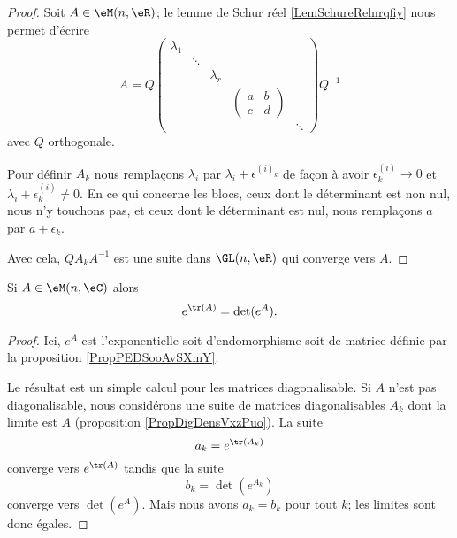 \begin{proof}
    Soit \( A\in \eM(n,\eR)\); le lemme de Schur réel \ref{LemSchureRelnrqfiy} nous permet d'écrire
    \begin{equation}
        A=Q
        \begin{pmatrix}
            \lambda_1    &       &       &       &   \\  
                &   \ddots    &       &       &   \\  
                &       &  \lambda_r     &       &   \\  
                &  &     &   \begin{pmatrix}
                    a    &   b    \\ 
                    c    &   d    
                \end{pmatrix}&          \\  
                &       &       &       &   \ddots    
        \end{pmatrix}
        Q^{-1}
    \end{equation}
    avec \( Q\) orthogonale.

    Pour définir \( A_k\) nous remplaçons \( \lambda_i\) par \( \lambda_i+\epsilon^{(i)_k}\) de façon à avoir \( \epsilon^{(i)}_k\to 0\) et \( \lambda_i+\epsilon^{(i)}_k\neq 0\). En ce qui concerne les blocs, ceux dont le déterminant est non nul, nous n'y touchons pas, et ceux dont le déterminant est nul, nous remplaçons \( a\) par \( a+\epsilon_k\).

    Avec cela, \( QA_kA^{-1}\) est une suite dans \( \GL(n,\eR)\) qui converge vers \( A\).
\end{proof}

\begin{proposition}     \label{PROPooZUHOooQBwfZq}
    Si \( A\in\eM(n,\eC)\) alors
    \begin{equation}
        e^{\tr(A)}=\det( e^{A}).
    \end{equation}
\end{proposition}

\begin{proof}
    Ici, \( e^A\) est l'exponentielle soit d'endomorphisme soit de matrice définie par la proposition \ref{PropPEDSooAvSXmY}.

    Le résultat est un simple calcul pour les matrices diagonalisable. Si \( A\) n'est pas diagonalisable, nous considérons une suite de matrices diagonalisables \( A_k\) dont la limite est \( A\) (proposition \ref{PropDigDensVxzPuo}). La suite
    \begin{equation}
        a_k= e^{\tr(A_k)}
    \end{equation}
    converge vers \(  e^{\tr(A)}\) tandis que la suite 
    \begin{equation}
        b_k=\det( e^{A_k})
    \end{equation}
    converge vers \( \det( e^{A})\). Mais nous avons \( a_k=b_k\) pour tout \( k\); les limites sont donc égales.
\end{proof}

